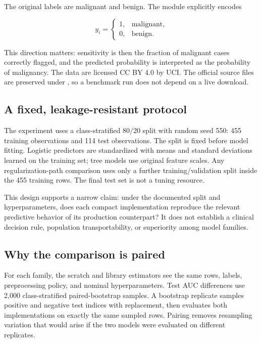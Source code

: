 \documentclass[11pt]{article}
\begin{document}
The original labels are malignant and benign. The module explicitly encodes

\[
 y_i = \begin{cases}
 1, & \text{malignant},\\
 0, & \text{benign}.
 \end{cases}
\]

This direction matters: sensitivity is then the fraction of malignant cases
correctly flagged, and the predicted probability is interpreted as the
probability of malignancy. The data are licensed CC BY 4.0 by UCI. The official
source files are preserved under , so a benchmark run
does not depend on a live download.

\subsection{A fixed, leakage-resistant protocol}

The experiment uses a class-stratified 80/20 split with random seed 550: 455
training observations and 114 test observations. The split is fixed before
model fitting. Logistic predictors are standardized with means and standard
deviations learned on the training set; tree models use original feature scales.
Any regularization-path comparison uses only a further training/validation split
inside the 455 training rows. The final test set is not a tuning resource.

This design supports a narrow claim: under the documented split and
hyperparameters, does each compact implementation reproduce the relevant
predictive behavior of its production counterpart? It does not establish a
clinical decision rule, population transportability, or superiority among model
families.

\subsection{Why the comparison is paired}

For each family, the scratch and library estimators see the same rows, labels,
preprocessing policy, and nominal hyperparameters. Test AUC differences use
2,000 class-stratified paired-bootstrap samples. A bootstrap replicate samples
positive and negative test indices with replacement, then evaluates both
implementations on exactly the same sampled rows. Pairing removes resampling
variation that would arise if the two models were evaluated on different
replicates.
\end{document}
